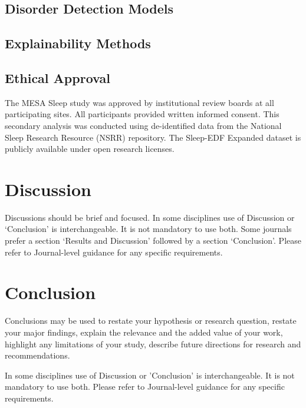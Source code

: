 \documentclass[pdflatex,sn-mathphys-num]{sn-jnl}%
\theoremstyle{thmstyleone}%
\theoremstyle{thmstyletwo}%
\theoremstyle{thmstylethree}%
\begin{document}
\subsection{Disorder Detection Models}\label{subsec:disorder}

\subsection{Explainability Methods}\label{subsec:explainability}

\subsection{Ethical Approval}

The MESA Sleep study was approved by institutional review boards at all participating sites. All participants provided written informed consent. This secondary analysis was conducted using de-identified data from the National Sleep Research Resource (NSRR) repository. The Sleep-EDF Expanded dataset is publicly available under open research licenses.

\section{Discussion}\label{sec12}

Discussions should be brief and focused. In some disciplines use of Discussion or `Conclusion' is interchangeable. It is not mandatory to use both. Some journals prefer a section `Results and Discussion' followed by a section `Conclusion'. Please refer to Journal-level guidance for any specific requirements. 

\section{Conclusion}\label{sec13}

Conclusions may be used to restate your hypothesis or research question, restate your major findings, explain the relevance and the added value of your work, highlight any limitations of your study, describe future directions for research and recommendations. 

In some disciplines use of Discussion or 'Conclusion' is interchangeable. It is not mandatory to use both. Please refer to Journal-level guidance for any specific requirements. 

\backmatter

\end{document}
